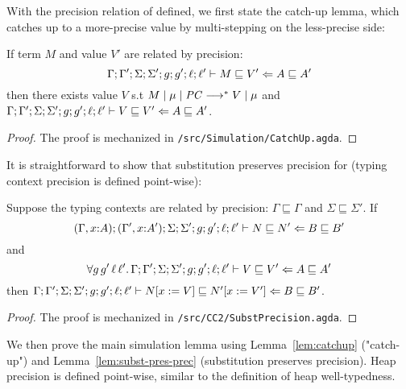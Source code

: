 With the precision relation of \CC defined, we first state the catch-up lemma,
which catches up to a more-precise value by multi-stepping on the less-precise
side:

\begin{lemma}
\label{lem:catchup}
If term $M$ and value $V'$ are related by precision:
$${\Gamma};{\Gamma'};{\Sigma};{\Sigma'};{g};{g'};{\ell};{\ell'}\vdash{M}\sqsubseteq{V'}\Leftarrow{A}\sqsubseteq{A'}$$
then there exists value $V$ s.t $M\mid\mu\mid\mathit{PC} \longrightarrow^{*} V\mid\mu$ and
${\Gamma};{\Gamma'};{\Sigma};{\Sigma'};{g};{g'};{\ell};{\ell'}\vdash{V}\sqsubseteq{V'}\Leftarrow{A}\sqsubseteq{A'}$.
\end{lemma}
\begin{proof}
  The proof is mechanized in \texttt{/src/Simulation/CatchUp.agda}.
\end{proof}

It is straightforward to show that substitution preserves precision for \CC
(typing context precision is defined point-wise):

\begin{lemma}
  \label{lem:subst-pres-prec}
  Suppose the typing contexts are related by precision: $\Gamma \sqsubseteq
  \Gamma$ and $\Sigma \sqsubseteq \Sigma'$. If
  $${(\Gamma,x{:}A)};{(\Gamma',x{:}A')};{\Sigma};{\Sigma'};{g};{g'};{\ell};{\ell'}\vdash{N}\sqsubseteq{N'}\Leftarrow{B}\sqsubseteq{B'}$$
  and
  $$\forall g\,g'\,\ell\,\ell'.\, {\Gamma};{\Gamma'};{\Sigma};{\Sigma'};{g};{g'};{\ell};{\ell'}\vdash{V}\sqsubseteq{V'}\Leftarrow{A}\sqsubseteq{A'}$$
  then
  ${\Gamma};{\Gamma'};{\Sigma};{\Sigma'};{g};{g'};{\ell};{\ell'}\vdash{N[x:=V]}\sqsubseteq{N'[x:=V']}\Leftarrow{B}\sqsubseteq{B'}$.
\end{lemma}
\begin{proof}
  The proof is mechanized in \texttt{/src/CC2/SubstPrecision.agda}.
\end{proof}

We then prove the main simulation lemma using Lemma~\ref{lem:catchup}
("catch-up") and Lemma~\ref{lem:subst-pres-prec} (substitution preserves
precision). Heap precision is defined point-wise, similar to the definition of
heap well-typedness.

